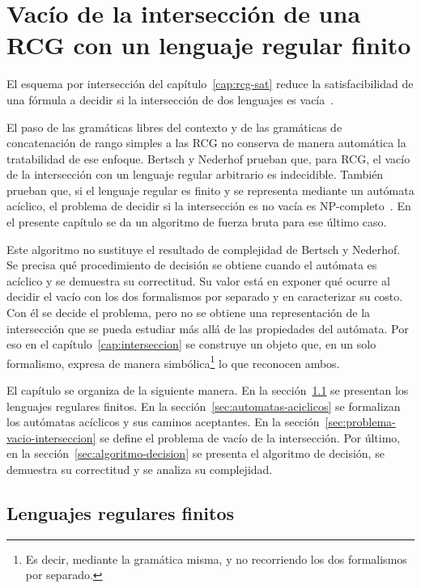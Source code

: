 
\chapter{Vacío de la intersección de una RCG con un lenguaje regular finito}
\label{cap:vacio-interseccion-rcg-regular}

El esquema por intersección del capítulo~\ref{cap:rcg-sat} reduce la
satisfacibilidad de una fórmula a decidir si la intersección de dos
lenguajes es vacía~\cite{fernandezarias2007,aguileralopez2016}.

El paso de las gramáticas libres del contexto y de las gramáticas de
concatenación de rango simples a las RCG no conserva de manera
automática la tratabilidad de ese enfoque. Bertsch y Nederhof prueban
que, para RCG, el vacío de la intersección con un lenguaje
regular arbitrario es indecidible. También prueban que, si el lenguaje
regular es finito y se representa mediante un autómata acíclico, el
problema de decidir si la intersección es no vacía es
NP-completo~\cite{bertsch2001rcg}. En el presente capítulo se da un
algoritmo de fuerza bruta para ese último caso.

Este algoritmo no sustituye el resultado de complejidad de
Bertsch y Nederhof. Se precisa qué procedimiento de decisión se obtiene
cuando el autómata es acíclico y se demuestra su correctitud. Su valor
está en exponer qué ocurre al decidir el vacío con los dos formalismos
por separado y en caracterizar su costo. Con él se decide el problema,
pero no se obtiene una representación de la intersección que se pueda
estudiar más allá de las propiedades del autómata. Por eso en el
capítulo~\ref{cap:interseccion}
se construye un objeto que, en un solo formalismo, expresa de manera
simbólica\footnote{Es decir, mediante la gramática misma, y no
recorriendo los dos formalismos por separado.} lo que reconocen ambos.

El capítulo se organiza de la siguiente manera. En la
sección~\ref{sec:lenguajes-regulares-finitos} se presentan los lenguajes
regulares finitos. En la sección~\ref{sec:automatas-aciclicos} se
formalizan los autómatas acíclicos y sus caminos aceptantes. En la
sección~\ref{sec:problema-vacio-interseccion} se define el problema de
vacío de la intersección. Por último, en la
sección~\ref{sec:algoritmo-decision} se presenta el algoritmo de
decisión, se demuestra su correctitud y se analiza su complejidad.

\section{Lenguajes regulares finitos}
\label{sec:lenguajes-regulares-finitos}

